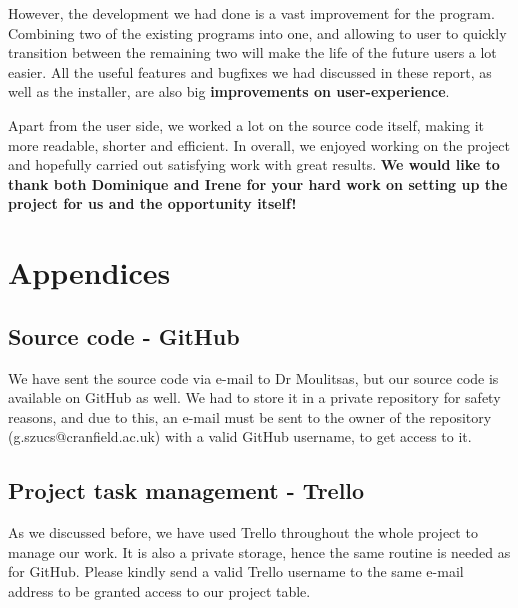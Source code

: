 \documentclass[a4paper, 11pt, article]{report}
\begin{document}
However, the development we had done is a vast improvement for the program. Combining two of the existing programs into one, and allowing to user to quickly transition between the remaining two will make the life of the future users a lot easier. All the useful features and bugfixes we had discussed in these report, as well as the installer, are also big \textbf{improvements on user-experience}.

Apart from the user side, we worked a lot on the source code itself, making it more readable, shorter and efficient. In overall, we enjoyed working on the project and hopefully carried out satisfying work with great results. \textbf{We would like to thank both Dominique and Irene for your hard work on setting up the project for us and the opportunity itself!}


\chapter{Appendices}

\section{Source code - GitHub}

We have sent the source code via e-mail to Dr Moulitsas, but our source code is available on GitHub as well. We had to store it in a private repository for safety reasons, and due to this, an e-mail must be sent to the owner of the repository (g.szucs@cranfield.ac.uk) with a valid GitHub username, to get access to it. 

\section{Project task management - Trello}

As we discussed before, we have used Trello throughout the whole project to manage our work. It is also a private storage, hence the same routine is needed as for GitHub. Please kindly send a valid Trello username to the same e-mail address to be granted access to our project table. 

\end{document}
